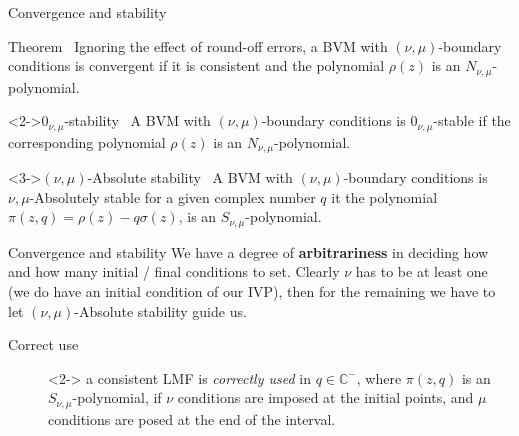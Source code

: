 \documentclass[aspectratio=169,xcolor=dvipsnames]{beamer}
\begin{document}
\begin{frame}{Convergence and stability}

\begin{alertblock}{Theorem~\parencite[Theorem 4.4.3]{MR1673796}}
Ignoring the effect of round-off errors, a BVM with $(\nu,\mu)$-boundary conditions is convergent if it is consistent and the polynomial $\rho(z)$ is an $N_{\nu,\mu}$-polynomial.
\end{alertblock}


\begin{block}<2->{$0_{\nu,\mu}$-stability~\parencite[Definition 4.5.1]{MR1673796}}
A BVM with $(\nu,\mu)$-boundary conditions is $0_{\nu,\mu}$-stable if the corresponding polynomial $\rho(z)$ is an $N_{\nu,\mu}$-polynomial.
\end{block}

\begin{block}<3->{$(\nu,\mu)$-Absolute stability~\parencite[Definition 4.7.1]{MR1673796}}
A BVM with $(\nu,\mu)$-boundary conditions is ${\nu,\mu}$-Absolutely stable for a given complex number $q$ it the polynomial $\pi(z,q) = \rho(z) - q \sigma(z)$, is an $S_{\nu,\mu}$-polynomial.
\end{block}

\end{frame}

\begin{frame}{Convergence and stability}
We have a degree of \alert{\textbf{arbitrariness}} in deciding how and how many initial / final conditions to set. Clearly $\nu$ has to be at least one (we do have an initial condition of our IVP), then for the remaining we have to let $(\nu,\mu)$-Absolute stability guide us.
\begin{description}
	\item[Correct use]<2-> a consistent LMF is \emph{correctly used} in $q \in \mathbb{C}^-$, where $\pi(z,q)$ is an $S_{\nu,\mu}$-polynomial, if $\nu$ conditions are imposed at the initial points, and $\mu$ conditions are posed at the end of the interval.
\end{description}


\end{frame}
\end{document}
